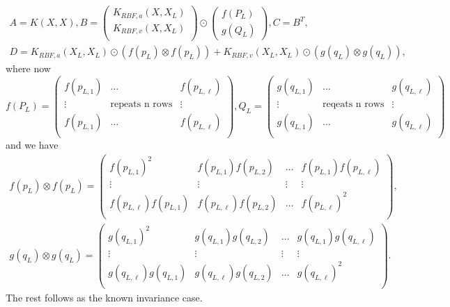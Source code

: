 \documentclass{statsmsc}
\begin{document}
\begin{equation}
\begin{gathered}
A=K(X,X), B=\begin{pmatrix}
    K_{RBF,a}(X, X_L) \\ K_{RBF,v}(X, X_L) \\
\end{pmatrix}\odot \begin{pmatrix}
    f(P_L) \\ g(Q_L)
\end{pmatrix}, C=B^T,\\ D=K_{RBF,a}(X_L, X_L)\odot (f(p_L)\otimes f(p_L)) + K_{RBF,v}(X_L, X_L)\odot (g(q_L)\otimes g(q_L)),
\end{gathered}
\label{equ:ABCDp}
\end{equation}
where now
$$
f(P_L)=\begin{pmatrix}
  f(p_{L,1})  & \dots & f(p_{L,\ell})  \\
  \vdots & \text{repeats n rows} &  \vdots\\
  f(p_{L,1})  & \dots & f(p_{L,\ell})  \\
\end{pmatrix},
Q_L=\begin{pmatrix}
  g(q_{L,1})  & \dots & g(q_{L,\ell})  \\
  \vdots & \text{reqeats n rows} &  \vdots\\
  g(q_{L,1})  & \dots & g(q_{L,\ell})  \\
\end{pmatrix}
$$
and we have 
$$
  \begin{gathered}
f(p_L)\otimes f(p_L)=\begin{pmatrix}
  f(p_{L,1})^2 & f(p_{L,1})f(p_{L,2}) & \dots & f(p_{L,1})f(p_{L,\ell}) \\
  \vdots & \vdots & \vdots & \vdots \\
  f(p_{L,\ell})f(p_{L,1}) & f(p_{L,\ell})f(p_{L,2}) & \dots & f(p_{L,\ell})^2 \\
\end{pmatrix},\\
g(q_L)\otimes g(q_L)=\begin{pmatrix}
  g(q_{L,1})^2 & g(q_{L,1})g(q_{L,2}) & \dots & g(q_{L,1})g(q_{L,\ell}) \\
  \vdots & \vdots & \vdots & \vdots \\
  g(q_{L,\ell})g(q_{L,1}) & g(q_{L,\ell})g(q_{L,2}) & \dots & g(q_{L,\ell})^2 \\
\end{pmatrix}.
  \end{gathered}
$$
The rest follows as the known invariance case.
\end{document}
